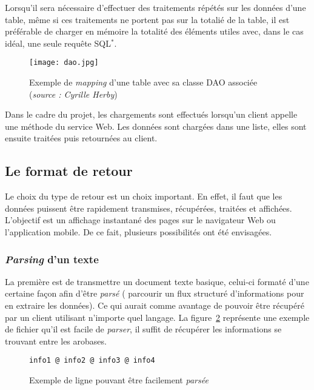 Lorsqu'il sera n\'ecessaire d'effectuer des traitements r\'ep\'et\'es sur les donn\'ees d'une table, m\^eme si ces traitements ne portent pas sur la totali\'e de la table, il est pr\'ef\'erable de charger en m\'emoire la totalit\'e des \'el\'ements utiles avec, dans le cas id\'eal, une seule requ\^ete SQL$^*$.

\begin{figure}[!ht]
	\centering
	\texttt{[image: dao.jpg]}
	\caption{Exemple de \textit{mapping} d'une table avec sa classe DAO associ\'ee (\textit{source : Cyrille Herby})}
	\label{figure:dao}

\end{figure}

Dans le cadre du projet, les chargements sont effectu\'es lorsqu'un client appelle une m\'ethode du service Web. 
Les donn\'ees sont charg\'ees dans une liste, elles sont ensuite trait\'ees puis retourn\'ees au client.

\subsection{Le format de retour}
\label{section:formatRetour}

Le choix du type de retour est un choix important.
En effet, il faut que les donn\'ees puissent \^etre rapidement transmises, r\'ecup\'er\'ees, trait\'ees et affich\'ees.
L'objectif est un affichage instantan\'e des pages sur le navigateur Web ou l'application mobile.
De ce fait, plusieurs possibilit\'es ont \'et\'e envisag\'ees.


\subsubsection{{\og}\textit{Parsing}{\fg} d'un texte}

La premi\`ere est de transmettre un document texte basique, celui-ci format\'e d'une certaine fa\c{c}on afin d'\^etre \textit{pars\'e} ({\cad} parcourir un flux structur\'e d'informations pour en extraire les donn\'ees).
Ce qui aurait comme avantage de pouvoir \^etre r\'ecup\'er\'e par un client utilisant n'importe quel langage.
La figure~\ref{code:exemplePlaintext} repr\'esente une exemple de fichier qu'il est facile de \textit{parser}, il suffit de r\'ecup\'erer les informations se trouvant entre les arobases.

\vspace{0.20cm}

\begin{figure}[!ht]
	\begin{lstlisting}[language=plaintext]
	info1 @ info2 @ info3 @ info4
	\end{lstlisting}
	
	\caption{Exemple de ligne pouvant \^etre facilement \textit{pars\'ee}}
	\label{code:exemplePlaintext}

\end{figure}

